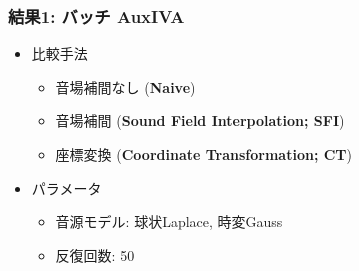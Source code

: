\documentclass[twocolumn,9pt,dvipdfmx]{article}
\begin{document}
\subsubsection*{結果1: バッチ AuxIVA}
\begin{itemize}
  \item 比較手法
    \begin{itemize}
      \item 音場補間なし (\textbf{Naive})
      \item 音場補間 (\textbf{Sound Field Interpolation; SFI})
      \item 座標変換 (\textbf{Coordinate Transformation; CT})
    \end{itemize}
  \item パラメータ
    \begin{itemize}
      \item 音源モデル: 球状Laplace, 時変Gauss
      \item 反復回数: 50
    \end{itemize}
\end{itemize}
\end{document}
